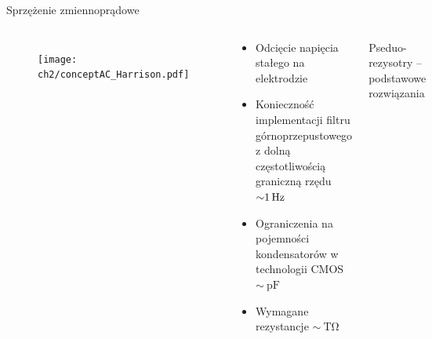 \begin{frame}{Sprzężenie zmiennoprądowe}
    

    \begin{columns}
        \vspace{-1em} %

        \begin{figure}[H]
            \centering
            \texttt{[image: ch2/conceptAC\_Harrison.pdf]} 
        \end{figure}
        \vspace{-2em} %

        {\renewcommand\normalsize{\small}%
        \normalsize
    
    
        \begin{exampleblock}{}

            \begin{itemize}
                \item Odcięcie napięcia stałego na elektrodzie 
                \item Konieczność implementacji filtru górnoprzepustowego z dolną częstotliwością graniczną rzędu~$\SI{\sim 1}{\hertz}$ 
                \item Ograniczenia na pojemności kondensatorów w technologii CMOS $\sim\SI{}{\pico\farad}$
                \item  Wymagane rezystancje  $\sim\SI{}{\tera\ohm}$
            \end{itemize}
        \end{exampleblock}
    
        }


        \vspace{-1.5em}
        \begin{block}{Pseduo-rezysotry -- podstawowe rozwiązania}




            \begin{figure}[H]
            \includegraphics[scale = 0.48]{Figures/ps.pdf}
            \end{figure}
            \vspace{-1em}


\end{block}
\end{columns}
\end{frame}
